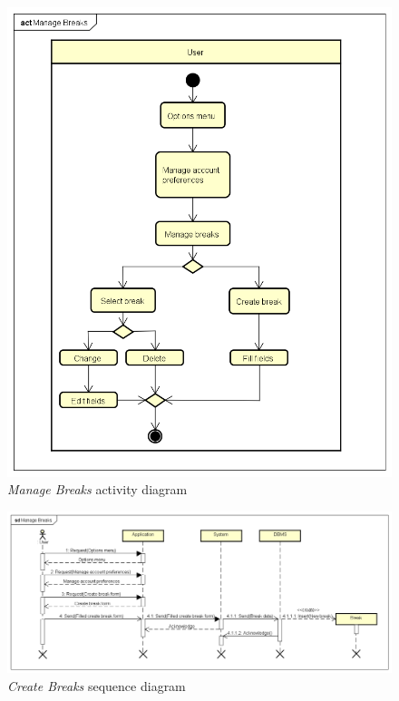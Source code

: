 \begin{figure}[h]
\centering
	\includegraphics[width=\textheight, height=\textwidth, keepaspectratio=true]{Img/ManageBreaksAC}
	\caption{\emph{Manage Breaks} activity diagram}
	\label{fig:ManageBreaksAC}
\end{figure}

\begin{figure}
	\includegraphics[width=\textheight, height=\textwidth, keepaspectratio=true]{Img/CreateBreaksSQ}
	\caption{\emph{Create Breaks} sequence diagram}
	\label{fig:CreateBreaksSQ}
\end{figure}

